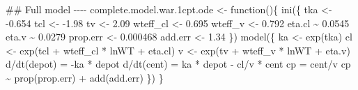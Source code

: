 \documentclass[
]{article}
\newenvironment{Shaded}{}{}
\newcommand{\ControlFlowTok}[1]{\textcolor[rgb]{0.84,0.23,0.29}{#1}}
\newcommand{\DocumentationTok}[1]{\textcolor[rgb]{0.42,0.45,0.49}{#1}}
\newcommand{\FloatTok}[1]{\textcolor[rgb]{0.00,0.36,0.77}{#1}}
\newcommand{\FunctionTok}[1]{\textcolor[rgb]{0.44,0.26,0.76}{#1}}
\newcommand{\NormalTok}[1]{\textcolor[rgb]{0.14,0.16,0.18}{#1}}
\newcommand{\OtherTok}[1]{\textcolor[rgb]{0.44,0.26,0.76}{#1}}
\newcommand{\SpecialCharTok}[1]{\textcolor[rgb]{0.00,0.36,0.77}{#1}}
\begin{document}
\begin{Shaded}
\begin{Highlighting}[]
\DocumentationTok{\#\# Full model {-}{-}{-}{-}}
\NormalTok{complete.model.war}\FloatTok{.1}\NormalTok{cpt.ode }\OtherTok{\textless{}{-}} \ControlFlowTok{function}\NormalTok{()\{}
  \FunctionTok{ini}\NormalTok{(\{}
\NormalTok{    tka }\OtherTok{\textless{}{-}} \SpecialCharTok{{-}}\FloatTok{0.654}
\NormalTok{    tcl }\OtherTok{\textless{}{-}} \SpecialCharTok{{-}}\FloatTok{1.98}
\NormalTok{    tv }\OtherTok{\textless{}{-}} \FloatTok{2.09}
\NormalTok{    wteff\_cl }\OtherTok{\textless{}{-}} \FloatTok{0.695}
\NormalTok{    wteff\_v }\OtherTok{\textless{}{-}} \FloatTok{0.792}
\NormalTok{    eta.cl }\SpecialCharTok{\textasciitilde{}} \FloatTok{0.0545}
\NormalTok{    eta.v }\SpecialCharTok{\textasciitilde{}} \FloatTok{0.0279}
\NormalTok{    prop.err }\OtherTok{\textless{}{-}} \FloatTok{0.000468}
\NormalTok{    add.err }\OtherTok{\textless{}{-}} \FloatTok{1.34}
\NormalTok{  \})}
  \FunctionTok{model}\NormalTok{(\{}
\NormalTok{    ka }\OtherTok{\textless{}{-}} \FunctionTok{exp}\NormalTok{(tka)}
\NormalTok{    cl }\OtherTok{\textless{}{-}} \FunctionTok{exp}\NormalTok{(tcl }\SpecialCharTok{+}\NormalTok{ wteff\_cl }\SpecialCharTok{*}\NormalTok{ lnWT }\SpecialCharTok{+}\NormalTok{ eta.cl)}
\NormalTok{    v }\OtherTok{\textless{}{-}} \FunctionTok{exp}\NormalTok{(tv }\SpecialCharTok{+}\NormalTok{ wteff\_v }\SpecialCharTok{*}\NormalTok{ lnWT }\SpecialCharTok{+}\NormalTok{ eta.v)}
\NormalTok{    d}\SpecialCharTok{/}\FunctionTok{dt}\NormalTok{(depot) }\OtherTok{=} \SpecialCharTok{{-}}\NormalTok{ka }\SpecialCharTok{*}\NormalTok{ depot}
\NormalTok{    d}\SpecialCharTok{/}\FunctionTok{dt}\NormalTok{(cent) }\OtherTok{=}\NormalTok{ ka }\SpecialCharTok{*}\NormalTok{ depot }\SpecialCharTok{{-}}\NormalTok{ cl}\SpecialCharTok{/}\NormalTok{v }\SpecialCharTok{*}\NormalTok{ cent}
\NormalTok{    cp }\OtherTok{=}\NormalTok{ cent}\SpecialCharTok{/}\NormalTok{v}
\NormalTok{    cp }\SpecialCharTok{\textasciitilde{}} \FunctionTok{prop}\NormalTok{(prop.err) }\SpecialCharTok{+} \FunctionTok{add}\NormalTok{(add.err)}
\NormalTok{  \})}
\NormalTok{\}}


\end{Highlighting}
\end{Shaded}
\end{document}
